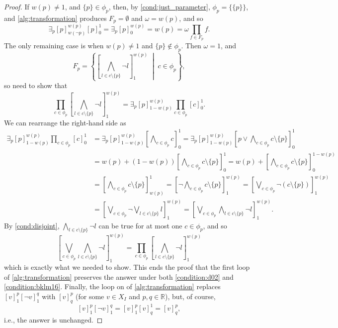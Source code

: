 \documentclass[runningheads]{llncs}
\begin{document}
\begin{proof}
  If $w(p) \ne 1$, and $\{ p \} \in \phi_p$, then, by
  \cref{cond:just_parameter}, $\phi_p = \{ \{ p \} \}$, and
  \cref{alg:transformation} produces $F_p = \emptyset$ and $\omega = w(p)$, and
  so
  \[
    \exists_p [p]_{w(\neg p)}^{w(p)} [p]_0^1 = \exists_p [p]^{w(p)}_0 = w(p) =
    \omega \prod_{f \in F_p} f.
  \]
  The only remaining case is when $w(p) \ne 1$ and $\{ p \} \not \in \phi_p$.
  Then $\omega = 1$, and
  \[
    F_p = \left\{ \left[\bigwedge_{l \in c \setminus \{ p \}} \neg
        l\right]_1^{w(p)} \;\middle|\; c \in \phi_p \right\},
  \]
  so need to show that
  \[
    \prod_{c \in \phi_p} \left[\bigwedge_{l \in c \setminus \{ p \}} \neg
      l\right]_1^{w(p)} = \exists_p [p]_{1-w(p)}^{w(p)} \prod_{c \in \phi_p}
    [c]_0^1.
  \]
  We can rearrange the right-hand side as
  \begin{align*}
    \exists_p [p]_{1-w(p)}^{w(p)} \prod_{c \in \phi_p} [c]_0^1 &= \exists_p [p]_{1-w(p)}^{w(p)} \left[\bigwedge_{c \in \phi_p} c\right]_0^1 = \exists_p [p]_{1-w(p)}^{w(p)} \left[ p \lor \bigwedge_{c \in \phi_p} c \setminus \{ p \} \right]_0^1 \\
                                                               &= w(p) + (1-w(p)) \left[ \bigwedge_{c \in \phi_p} c \setminus \{ p \} \right]_0^1 = w(p) + \left[ \bigwedge_{c \in \phi_p} c \setminus \{ p \} \right]_0^{1-w(p)} \\
                                                               &= \left[ \bigwedge_{c \in \phi_p} c \setminus \{ p \} \right]_{w(p)}^1 = \left[ \neg \bigwedge_{c \in \phi_p} c \setminus \{ p \} \right]_1^{w(p)} = \left[ \bigvee_{c \in \phi_p} \neg(c \setminus \{ p \}) \right]_1^{w(p)} \\
                                                               &= \left[ \bigvee_{c \in \phi_p} \neg \bigvee_{l \in c \setminus \{ p \}} l \right]_1^{w(p)} = \left[ \bigvee_{c \in \phi_p} \bigwedge_{l \in c \setminus \{ p \}} \neg l \right]_1^{w(p)}.
  \end{align*}
   By \cref{cond:disjoint}, $\bigwedge_{l \in c \setminus \{ p \}} \neg l$ can
   be true for at most one $c \in \phi_p$, and so
   \[
     \left[ \bigvee_{c \in \phi_p} \bigwedge_{l \in c \setminus \{ p \}} \neg l
     \right]_1^{w(p)} = \prod_{c \in \phi_p} \left[ \bigwedge_{l \in c \setminus
         \{ p \}} \neg l \right]_1^{w(p)}
   \]
   which is exactly what we needed to show. This ends the proof that the
   first loop of \cref{alg:transformation} preserves the answer under both
   \cref{condition:d02} and \cref{condition:bklm16}. Finally, the loop on
    of \cref{alg:transformation}
   replaces $[v]_1^p[\neg v]_1^q$ with $[v]_q^p$ (for some $v \in X_I$ and $p, q
   \in \mathbb{R}$), but, of course,
   \[
     [v]_1^p[\neg v]_1^q = [v]_1^p[v]_q^1 = [v]_q^p,
   \]
   i.e., the answer is unchanged.
\end{proof}
\end{document}

